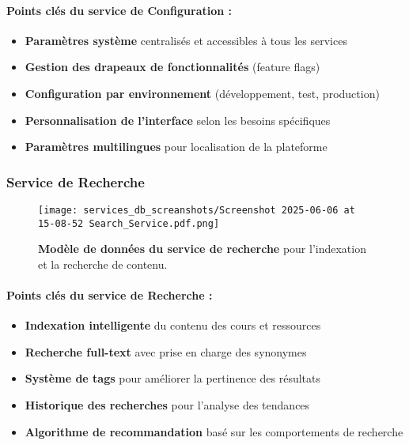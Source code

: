 \paragraph{Points clés du service de Configuration :}
\begin{itemize}[leftmargin=*,noitemsep,topsep=0pt]
  \item \textbf{Paramètres système} centralisés et accessibles à tous les services
  \item \textbf{Gestion des drapeaux de fonctionnalités} (feature flags)
  \item \textbf{Configuration par environnement} (développement, test, production)
  \item \textbf{Personnalisation de l'interface} selon les besoins spécifiques
  \item \textbf{Paramètres multilingues} pour localisation de la plateforme
\end{itemize}
\normalsize
\newpage

\subsubsection{Service de Recherche}
\begin{figure}[h!]
  \centering
  \texttt{[image: services\_db\_screanshots/Screenshot 2025-06-06 at 15-08-52 Search\_Service.pdf.png]}
  \caption{\textbf{Modèle de données du service de recherche} pour l'indexation et la recherche de contenu.}
  \label{fig:search_service}
\end{figure}
\vspace{-10pt}
\small
\paragraph{Points clés du service de Recherche :}
\begin{itemize}[leftmargin=*,noitemsep,topsep=0pt]
  \item \textbf{Indexation intelligente} du contenu des cours et ressources
  \item \textbf{Recherche full-text} avec prise en charge des synonymes
  \item \textbf{Système de tags} pour améliorer la pertinence des résultats
  \item \textbf{Historique des recherches} pour l'analyse des tendances
  \item \textbf{Algorithme de recommandation} basé sur les comportements de recherche
\end{itemize}

